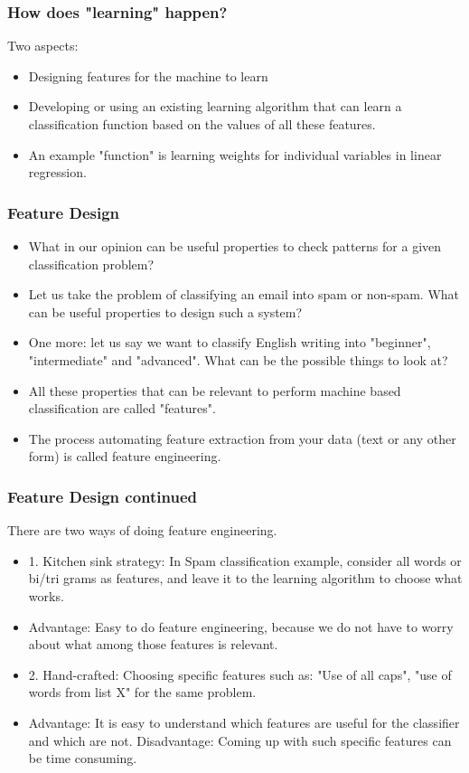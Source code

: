\documentclass{beamer}
\begin{document}
\begin{frame}
\frametitle{How does "learning" happen?}
Two aspects:
\begin{itemize}
\item Designing features for the machine to learn
\item Developing or using an existing learning algorithm that can learn a classification function based on the values of all these features.
\item An example "function" is learning weights for individual variables in linear regression.
\end{itemize}
\end{frame}

\begin{frame}
\frametitle{Feature Design}
\begin{itemize}
\item What in our opinion can be useful properties to check patterns for a given classification problem?
\item Let us take the problem of classifying an email into spam or non-spam. What can be useful properties to design such a system? \pause
\item One more: let us say we want to classify English writing into "beginner", "intermediate" and "advanced". What can be the possible things to look at? \pause
\item All these properties that can be relevant to perform machine based classification are called "features".
\item The process automating feature extraction from your data (text or any other form) is called feature engineering.
\end{itemize}
\end{frame}

\begin{frame}
\frametitle{Feature Design continued}
There are two ways of doing feature engineering.
\begin{itemize}
\item 1. Kitchen sink strategy: In Spam classification example, consider all words or bi/tri grams as features, and leave it to the learning algorithm to choose what works.
\item Advantage: Easy to do feature engineering, because we do not have to worry about what among those features is relevant.
\item 2. Hand-crafted: Choosing specific features such as: "Use of all caps", "use of words from list X" for the same problem. 
\item Advantage: It is easy to understand which features are useful for the classifier and which are not. Disadvantage: Coming up with such specific features can be time consuming.
\end{itemize}
\end{frame}
\end{document}
